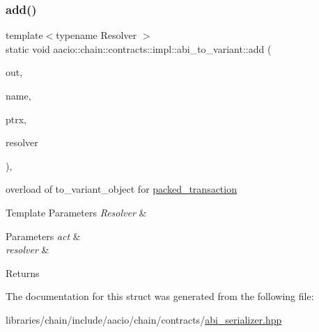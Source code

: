 \subsubsection{\texorpdfstring{add()}{add()}\hspace{0.1cm}{\footnotesize\ttfamily [5/5]}}
{\footnotesize\ttfamily template$<$typename Resolver $>$ \\
static void aacio\+::chain\+::contracts\+::impl\+::abi\+\_\+to\+\_\+variant\+::add (\begin{DoxyParamCaption}\item[{\mbox{\hyperlink{classfc_1_1mutable__variant__object}{mutable\+\_\+variant\+\_\+object}} \&}]{out,  }\item[{const char $\ast$}]{name,  }\item[{const \mbox{\hyperlink{structaacio_1_1chain_1_1packed__transaction}{packed\+\_\+transaction}} \&}]{ptrx,  }\item[{Resolver}]{resolver }\end{DoxyParamCaption})\hspace{0.3cm}{\ttfamily [inline]}, {\ttfamily [static]}}

overload of to\+\_\+variant\+\_\+object for \mbox{\hyperlink{structaacio_1_1chain_1_1packed__transaction}{packed\+\_\+transaction}} 
\begin{DoxyTemplParams}{Template Parameters}
{\em Resolver} & \\
\hline
\end{DoxyTemplParams}

\begin{DoxyParams}{Parameters}
{\em act} & \\
\hline
{\em resolver} & \\
\hline
\end{DoxyParams}
\begin{DoxyReturn}{Returns}

\end{DoxyReturn}


The documentation for this struct was generated from the following file\+:\begin{DoxyCompactItemize}
\item 
libraries/chain/include/aacio/chain/contracts/\mbox{\hyperlink{abi__serializer_8hpp}{abi\+\_\+serializer.\+hpp}}\end{DoxyCompactItemize}
